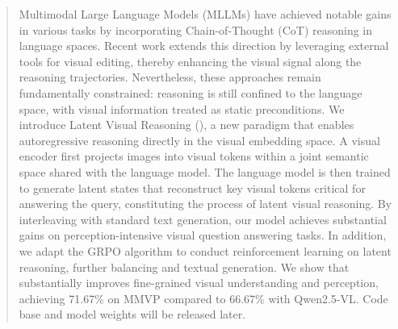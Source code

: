 \begin{abstract}
Multimodal Large Language Models (MLLMs) have achieved notable gains in various tasks by incorporating Chain-of-Thought (CoT) reasoning in language spaces. Recent work extends this direction by leveraging external tools for visual editing, thereby enhancing the visual signal along the reasoning trajectories. Nevertheless, these approaches remain fundamentally constrained: reasoning is still confined to the language space, with visual information treated as static preconditions. We introduce Latent Visual Reasoning (\modelname), a new paradigm that enables autoregressive reasoning directly in the visual embedding space. A visual encoder first projects images into visual tokens within a joint semantic space shared with the language model. The language model is then trained to generate latent states that reconstruct key visual tokens critical for answering the query, constituting the process of latent visual reasoning. By interleaving \modelname with standard text generation, our model achieves substantial gains on perception-intensive visual question answering tasks. In addition, we adapt the GRPO algorithm to conduct reinforcement learning on latent reasoning, further balancing \modelname and textual generation. We show that \modelname substantially improves fine-grained visual understanding and perception, achieving 71.67\% on MMVP compared to 66.67\% with Qwen2.5-VL. Code base and model weights will be released later.

\end{abstract}

